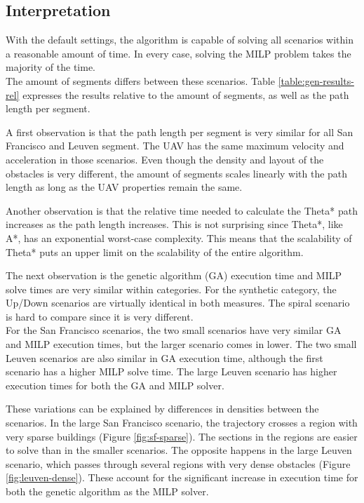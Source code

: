 \subsection{Interpretation}
With the default settings, the algorithm is capable of solving all scenarios within a reasonable amount of time. In every case, solving the MILP problem takes the majority of the time. \\
The amount of segments differs between these scenarios. Table \ref{table:gen-results-rel} expresses the results relative to the amount of segments, as well as the path length per segment.
\par
A first observation is that the path length per segment is very similar for all San Francisco and Leuven segment. The UAV has the same maximum velocity and acceleration in those scenarios. Even though the density and layout of the obstacles is very different, the amount of segments scales linearly with the path length as long as the UAV properties remain the same.
\par
Another observation is that the relative time needed to calculate the Theta* path increases as the path length increases. This is not surprising since Theta*, like A*, has an exponential worst-case complexity. This means that the scalability of Theta* puts an upper limit on the scalability of the entire algorithm.
\par
The next observation is the genetic algorithm (GA) execution time and MILP solve times are very similar within categories. For the synthetic category, the Up/Down scenarios are virtually identical in both measures. The spiral scenario is hard to compare since it is very different.  \\
For the San Francisco scenarios, the two small scenarios have very similar GA and MILP execution times, but the larger scenario comes in lower. The two small Leuven scenarios are also similar in GA execution time, although the first scenario has a higher MILP solve time. The large Leuven scenario has higher execution times for both the GA and MILP solver.
\par
These variations can be explained by differences in densities between the scenarios. In the large San Francisco scenario, the trajectory crosses a region with very sparse buildings (Figure \ref{fig:sf-sparse}). The sections in the regions are easier to solve than in the smaller scenarios. The opposite happens in the large Leuven scenario, which passes through several regions with very dense obstacles (Figure \ref{fig:leuven-dense}). These account for the significant increase in execution time for both the genetic algorithm as the MILP solver.


